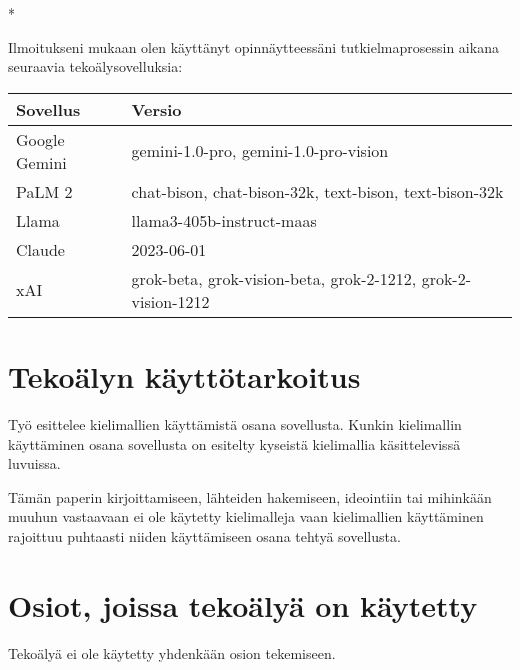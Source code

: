 \begin{aidisclaimer} * %

Ilmoitukseni mukaan olen käyttänyt opinnäytteessäni tutkielmaprosessin aikana
seuraavia tekoälysovelluksia:

\begin{center}
    \begin{tabularx}{\linewidth}{X|l}
        \toprule
        \textbf{Sovellus} & \textbf{Versio} \\
        \midrule
        Google Gemini & gemini-1.0-pro, gemini-1.0-pro-vision \\
        PaLM 2 & chat-bison, chat-bison-32k, text-bison, text-bison-32k \\
        Llama & llama3-405b-instruct-maas \\
        Claude & 2023-06-01 \\
        xAI & grok-beta, grok-vision-beta, grok-2-1212, grok-2-vision-1212 \\
        \bottomrule
    \end{tabularx}
\end{center}

\section*{Tekoälyn käyttötarkoitus}

Työ esittelee kielimallien käyttämistä osana sovellusta. Kunkin kielimallin
käyttäminen osana sovellusta on esitelty kyseistä kielimallia käsittelevissä
luvuissa.

Tämän paperin kirjoittamiseen, lähteiden hakemiseen, ideointiin tai mihinkään
muuhun vastaavaan ei ole käytetty kielimalleja vaan kielimallien käyttäminen
rajoittuu puhtaasti niiden käyttämiseen osana tehtyä sovellusta.

\section*{Osiot, joissa tekoälyä on käytetty}

Tekoälyä ei ole käytetty yhdenkään osion tekemiseen.

\end{aidisclaimer}
